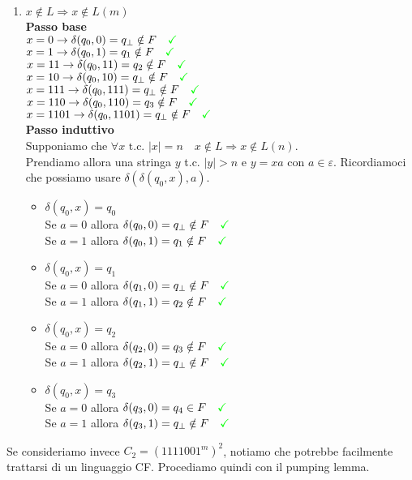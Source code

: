\documentclass[a4paper,oneside]{scrbook}
\newcommand{\greenmark}{\quad \textcolor{green}{\checkmark}}
\begin{document}
\begin{enumerate}
	\item $x\notin L \Rightarrow x \notin L(m)$\\
	\textbf{Passo base}\\
	$x=0 \rightarrow \delta(q_0,0)=q_\bot \notin F \greenmark$\\
	$x=1 \rightarrow \delta(q_0,1)=q_1 \notin F \greenmark$\\
	$x=11 \rightarrow \delta(q_0,11)=q_2 \notin F \greenmark$\\
	$x=10 \rightarrow \delta(q_0,10)=q_\bot \notin F \greenmark$\\
	$x=111 \rightarrow \delta(q_0,111)=q_\bot \notin F \greenmark$\\
	$x=110 \rightarrow \delta(q_0,110)=q_3 \notin F \greenmark$\\
	$x=1101 \rightarrow \delta(q_0,1101)=q_\bot \notin F \greenmark$\\
	\textbf{Passo induttivo}\\
	Supponiamo che $\forall x \text{ t.c. } |x|=n \quad x \notin L \Rightarrow x\notin L(n)$.\\
	Prendiamo allora una stringa $y$ t.c. $|y|>n$ e $y=xa \text{ con }a\in\varepsilon$. Ricordiamoci che possiamo usare $\delta(\delta(q_0,x),a)$.
	\begin{itemize}
		\item $\delta(q_0,x)=q_0$\\
		Se $a=0$ allora $\delta(q_0,0)=q_\bot \notin F \greenmark$\\
		Se $a=1$ allora $\delta(q_0,1)=q_1 \notin F \greenmark$
		\item $\delta(q_0,x)=q_1$\\
		Se $a=0$ allora $\delta(q_1,0)=q_\bot \notin F \greenmark$\\
		Se $a=1$ allora $\delta(q_1,1)=q_2 \notin F \greenmark$
		\item $\delta(q_0,x)=q_2$\\
		Se $a=0$ allora $\delta(q_2,0)=q_3 \notin F \greenmark$\\
		Se $a=1$ allora $\delta(q_2,1)=q_\bot \notin F \greenmark$
		\item $\delta(q_0,x)=q_3$\\
		Se $a=0$ allora $\delta(q_3,0)=q_4 \in F \greenmark$\\
		Se $a=1$ allora $\delta(q_3,1)=q_\bot \notin F \greenmark$
	\end{itemize}
\end{enumerate}
Se consideriamo invece $C_2=(1111001^m)^2$, notiamo che potrebbe facilmente trattarsi di un linguaggio CF. Procediamo quindi con il pumping lemma.
\end{document}
